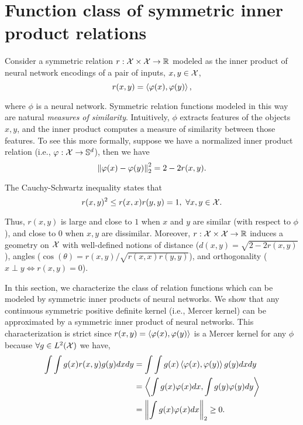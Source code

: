 \section{Function class of symmetric inner product relations}\label{sec:symmetric_relations}

Consider a symmetric relation $r: {\mathcal{X}} \times {\mathcal{X}} \to \mathbb{R}$ modeled as the inner product of neural network encodings of a pair of inputs, $x, y \in {\mathcal{X}}$,
\begin{equation}\label{eq:symmetric_iprod_relation}
    r(x, y) = \iprod{\phi(x)}{\phi(y)},
\end{equation}

\noindent where $\phi$ is a neural network. Symmetric relation functions modeled in this way are natural \textit{measures of similarity}. Intuitively, $\phi$ extracts features of the objects $x,y$, and the inner product computes a measure of similarity between those features. To see this more formally, suppose we have a normalized inner product relation (i.e., $\varphi: {\mathcal{X}} \to {\mathbb{S}}^{d}$), then we have
\begin{equation}
    \twonorm{\phi(x) - \phi(y)}^2 = 2 - 2 r(x, y).
\end{equation}

The Cauchy-Schwartz inequality states that
\begin{equation}
    r(x, y)^2 \leq r(x, x) r(y, y) = 1, \ \forall x, y \in \calX.
\end{equation}

Thus, $r(x,y)$ is large and close to $1$ when $x$ and $y$ are similar (with respect to $\phi$), and close to $0$ when $x, y$ are dissimilar. Moreover, $r: {\mathcal{X}} \times {\mathcal{X}} \to \mathbb{R}$ induces a geometry on ${\mathcal{X}}$ with well-defined notions of distance ($d(x,y) = \sqrt{2 - 2 r(x,y)}$), angles ($\cos(\theta) = r(x,y)/\sqrt{r(x,x) r(y,y)}$), and orthogonality ($x \perp y \iff r(x,y) = 0$).

In this section, we characterize the class of relation functions which can be modeled by symmetric inner products of neural networks. We show that any continuous symmetric positive definite kernel (i.e., Mercer kernel) can be approximated by a symmetric inner product of neural networks. This characterization is strict since $r(x,y) = \left \langle \varphi(x), \varphi(y) \right\rangle$ is a Mercer kernel for any $\phi$ because $\forall g \in L^2({\mathcal{X}})$ we have,
\begin{equation*}
    \begin{split}
        \int \int g(x) r(x,y) g(y) dx dy &= \int \int g(x) \iprod{\phi(x)}{\phi(y)} g(y) dx dy \\
        &= \iprod{\int g(x) \phi(x) dx}{\int g(y) \phi(y) dy} \\
        &= \twonorm{\int g(x) \phi(x) dx} \geq 0.
    \end{split}
\end{equation*}


